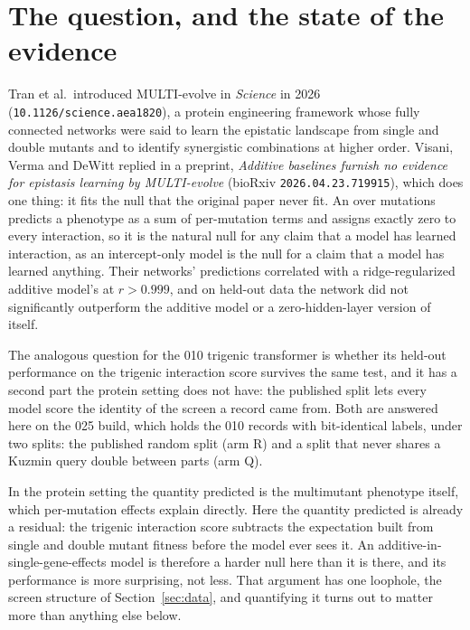 
\section{The question, and the state of the evidence}
\label{sec:question}

Tran et al.\ introduced MULTI-evolve in \emph{Science} in 2026
(\texttt{10.1126/science.aea1820}), a protein engineering framework whose fully
connected networks were said to learn the epistatic landscape from single and
double mutants and to identify synergistic combinations at higher order. Visani,
Verma and DeWitt replied in a preprint, \emph{Additive baselines furnish no evidence
for epistasis learning by MULTI-evolve} (bioRxiv \texttt{2026.04.23.719915}), which
does one thing: it fits the null that the original paper never fit. An
 over mutations predicts a phenotype as a sum of per-mutation
terms and assigns exactly zero to every interaction, so it is the natural null for
any claim that a model has learned interaction, as an intercept-only model is the
null for a claim that a model has learned anything. Their networks' predictions
correlated with a ridge-regularized additive model's at $r > 0.999$, and on held-out
data the network did not significantly outperform the additive model or a
zero-hidden-layer version of itself.

The analogous question for the 010 trigenic transformer is whether its held-out
performance on the trigenic interaction score survives the same test, and it has a
second part the protein setting does not have: the published split lets every model
score the identity of the screen a record came from. Both are answered here on the
025 build, which holds the 010 records with bit-identical labels, under two splits:
the published random split (arm R) and a split that never shares a Kuzmin query
double between parts (arm Q).

In the protein setting the quantity predicted is the multimutant phenotype itself,
which per-mutation effects explain directly. Here the quantity predicted is already
a residual: the trigenic interaction score subtracts the expectation built from
single and double mutant fitness before the model ever sees it. An
additive-in-single-gene-effects model is therefore a harder null here than it is
there, and its performance is more surprising, not less. That argument has one
loophole, the screen structure of Section~\ref{sec:data}, and quantifying it turns
out to matter more than anything else below.

